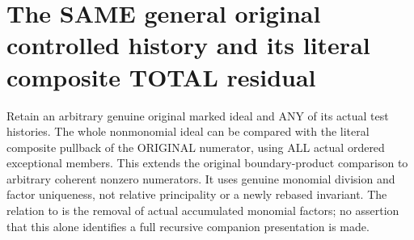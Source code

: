 \section{The SAME general original controlled history and its literal composite TOTAL residual}

Retain an arbitrary genuine original marked ideal and ANY of its actual
test histories. The whole nonmonomial ideal can be compared with the
literal composite pullback of the ORIGINAL numerator, using ALL actual
ordered exceptional members. This extends the original boundary-product
comparison to arbitrary coherent nonzero numerators. It uses genuine
monomial division and factor uniqueness, not relative principality or a
newly rebased invariant. The relation to \cite[Step II.B]{bierstone-milman08-functoriality}
is the removal of actual accumulated monomial factors; no assertion that
this alone identifies a full recursive companion presentation is made.

